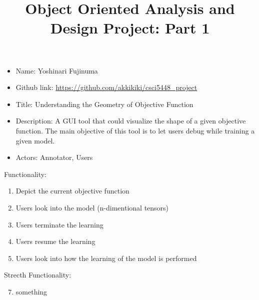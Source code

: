 \documentclass[11pt]{article}
\begin{document}
\vspace{-1cm}
\title{\vspace{-2ex} Object Oriented Analysis and Design Project: Part 1\vspace{-2ex}}
\date{\vspace{-6ex}}
\maketitle

\begin{itemize}
 \item Name: Yoshinari Fujinuma
 \item Github link: \url{https://github.com/akkikiki/csci5448_project}
 \item Title: Understanding the Geometry of Objective Function
 \item Description: A GUI tool that could visualize the shape of a given objective function. The main objective of this tool is to let users debug while training a given model. 
 \item Actors: Annotator, Users
\end{itemize}

Functionality:
\begin{enumerate}[leftmargin=4\parindent]
 \item Depict the current objective function
 \item Users look into the model (n-dimentional tensors)
 \item Users terminate the learning
 \item Users resume the learning
 \item Users look into how the learning of the model is performed
\end{enumerate}

Strecth Functionality:
\begin{enumerate}
 \setcounter{enumi}{6}
 \item something
\end{enumerate}
\end{document}
